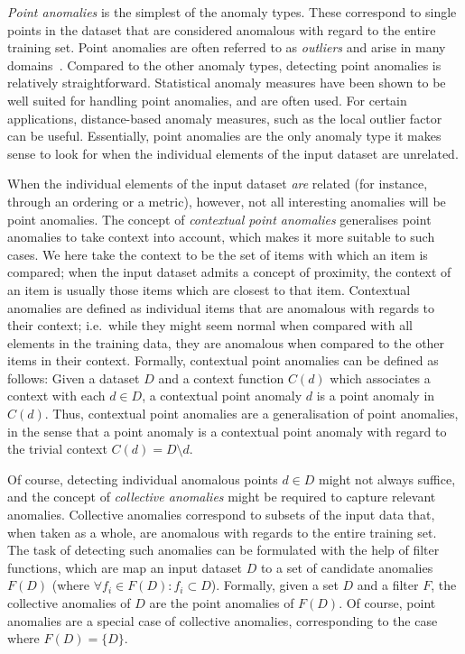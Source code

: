 \emph{Point anomalies} is the simplest of the anomaly types. These correspond to single points in the dataset that are considered anomalous with regard to the entire training set. Point anomalies are often referred to as \emph{outliers} and arise in many domains~\cite{eskin}. Compared to the other anomaly types, detecting point anomalies is relatively straightforward. Statistical anomaly measures have been shown to be well suited for handling point anomalies, and are often used. For certain applications, distance-based anomaly measures, such as the local outlier factor~\cite{TODO} can be useful. Essentially, point anomalies are the only anomaly type it makes sense to look for when the individual elements of the input dataset are unrelated.

When the individual elements of the input dataset \emph{are} related (for instance, through an ordering or a metric), however, not all interesting anomalies will be point anomalies. The concept of \emph{contextual point anomalies} generalises point anomalies to take context into account, which makes it more suitable to such cases. We here take the context to be the set of items with which an item is compared; when the input dataset admits a concept of proximity, the context of an item is usually those items which are closest to that item. Contextual anomalies are defined as individual items that are anomalous with regards to their context; i.e.\ while they might seem normal when compared with all elements in the training data, they are anomalous when compared to the other items in their context. Formally, contextual point anomalies can be defined as follows: Given a dataset $D$ and a context function $C(d)$ which associates a context with each $d \in D$, a contextual point anomaly $d$ is a point anomaly in $C(d)$. Thus, contextual point anomalies are a generalisation of point anomalies, in the sense that a point anomaly is a contextual point anomaly with regard to the trivial context $C(d) = D \setminus {d}$.

Of course, detecting individual anomalous points $d \in D$ might not always suffice, and the concept of \emph{collective anomalies} might be required to capture relevant anomalies. Collective anomalies correspond to subsets of the input data that, when taken as a whole, are anomalous with regards to the entire training set. The task of detecting such anomalies can be formulated with the help of filter functions, which are map an input dataset $D$ to a set of candidate anomalies $F(D)$ (where $\forall f_i \in F(D): f_i \subset D$). Formally, given a set $D$ and a filter $F$, the collective anomalies of $D$ are the point anomalies of $F(D)$. Of course, point anomalies are a special case of collective anomalies, corresponding to the case where $F(D) = \{D\}$.

